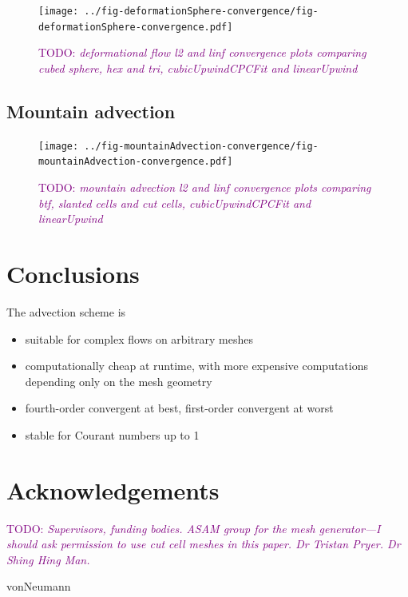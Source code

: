 \documentclass{article}
\newcommand{\TODO}[1]{\textcolor{purple}{TODO: \emph{#1}}}
\begin{document}
\begin{figure}
	\texttt{[image: ../fig-deformationSphere-convergence/fig-deformationSphere-convergence.pdf]}
	\caption{\TODO{deformational flow l2 and linf convergence plots comparing cubed sphere, hex and tri, cubicUpwindCPCFit and linearUpwind}}
\end{figure}


\subsection{Mountain advection}


\begin{figure}
	\texttt{[image: ../fig-mountainAdvection-convergence/fig-mountainAdvection-convergence.pdf]}
	\caption{\TODO{mountain advection l2 and linf convergence plots comparing btf, slanted cells and cut cells, cubicUpwindCPCFit and linearUpwind}}
\end{figure}

\section{Conclusions}

The advection scheme is
\begin{itemize}
	\item suitable for complex flows on arbitrary meshes
	\item computationally cheap at runtime, with more expensive computations depending only on the mesh geometry
	\item fourth-order convergent at best, first-order convergent at worst
	\item stable for Courant numbers up to 1
\end{itemize}

\section{Acknowledgements}
\TODO{Supervisors, funding bodies.  ASAM group for the mesh generator---I should ask permission to use cut cell meshes in this paper.  Dr Tristan Pryer.  Dr Shing Hing Man.}






 {vonNeumann}
\end{document}
